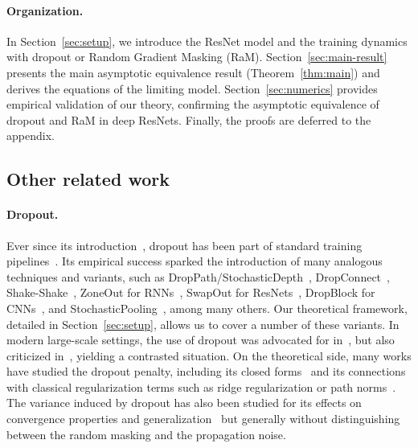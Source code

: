 \documentclass[a4paper,11pt]{article}
\newcommand{\1}{\mathbbm{1}}
\theoremstyle{definition}
\theoremstyle{remark}
\begin{document}
\paragraph{Organization.}
In Section~\ref{sec:setup}, we introduce the ResNet model and the training dynamics
with dropout or Random Gradient Masking (RaM). Section~\ref{sec:main-result}
presents the main asymptotic equivalence result (Theorem~\ref{thm:main}) and derives
the equations of the limiting model. Section~\ref{sec:numerics} provides empirical
validation of our theory, confirming the asymptotic equivalence of dropout and RaM in
deep ResNets. Finally, the proofs are deferred to the appendix.

\subsection{Other related work}
\paragraph{Dropout.} 
Ever since its introduction~\cite{hinton2012improvingneuralnetworkspreventing}, dropout has been part of standard training pipelines~\cite{vaswani2017attention,radford2018improving,devlin2019bertpretrainingdeepbidirectional,dosovitskiy2021imageworth16x16words,hu2021loralowrankadaptationlarge,ouyang2022traininglanguagemodelsfollow,ramesh2022hierarchicaltextconditionalimagegeneration,taylor2022galacticalargelanguagemodel}. Its empirical success sparked the introduction of many analogous techniques and variants, such as DropPath/StochasticDepth~\cite{huang2016deepnetworksstochasticdepth}, DropConnect~\cite{wan2013regularizationdropconnect}, Shake-Shake~\cite{gastaldi2017shakeshakeregularization}, 
ZoneOut for RNNs~\cite{krueger2017zoneoutregularizingrnnsrandomly}, SwapOut for ResNets~\cite{singh2016swapoutlearningensembledeep}, DropBlock for CNNs~\cite{ghiasi2018dropblockregularizationmethodconvolutional},
and StochasticPooling~\cite{zeiler2013stochasticpoolingregularizationdeep}, among many others. Our theoretical framework, detailed in Section~\ref{sec:setup}, allows us to cover a number of these variants. In modern large-scale settings, the use of dropout was advocated for in~\cite{xue2023repeatrepeatinsightsscaling,liu2023dropoutreducesunderfitting}, but also criticized in~\cite{liu2025drop}, yielding a contrasted situation.
%
On the theoretical side, many works have studied the dropout penalty, including its closed forms~\cite{arora2021explicitformscapacitycontrol} and its connections with classical regularization terms such as ridge regularization or path norms~\cite{wager2013dropouttrainingadaptiveregularization,arora2021explicitformscapacitycontrol,helmbold2015inductivebiasdropout,mou2018dropouttrainingdatadependentregularization}. The variance induced by dropout has also been studied for its effects on convergence properties and generalization~\cite{mianjy2020convergencegeneralizationdropouttraining,zhang2023implicitregularizationdropout,zhang2023stochasticmodifiedequationsdynamics,wei2020implicitexplicitregularizationeffects} but generally without distinguishing between the random masking and the propagation noise.
\end{document}
